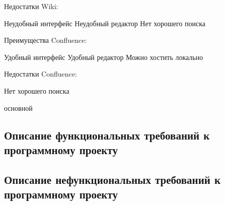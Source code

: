 Недостатки Wiki:

Неудобный интерфейс 
Неудобный редактор
Нет хорошего поиска


Преимущества Confluence:

Удобный интерфейс 
Удобный редактор 
Можно хостить локально

Недостатки Confluence:

Нет хорошего поиска


основной 
\subsection{Описание функциональных требований к программному проекту}

\subsection{Описание нефункциональных требований к программному проекту}